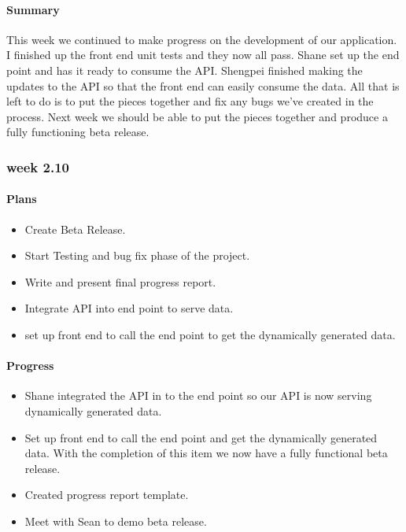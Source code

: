 \documentclass[onecolumn, draftclsnofoot,10pt, compsoc]{article}
\begin{document}
			\paragraph{Summary} \hfill \break 
			This week we continued to make progress on the development of our application. I finished up the front end unit tests and they now all pass. Shane set up the end point and has it ready to consume the API. Shengpei finished making the updates to the API so that the front end can easily consume the data. All that is left to do is to put the pieces together and fix any bugs we've created in the process. Next week we should be able to put the pieces together and produce a fully functioning beta release.\\

		\subsubsection{week 2.10}
			\paragraph{Plans} \hfill \break
				\begin{itemize}
					\item Create Beta Release.
					\item Start Testing and bug fix phase of the project.
					\item Write and present final progress report.
					\item Integrate API into end point to serve data.
					\item set up front end to call the end point to get the dynamically generated data.
				\end{itemize}
			\paragraph{Progress} \hfill \break
				\begin{itemize}
					\item Shane integrated the API in to the end point so our API is now serving dynamically generated data.
					\item Set up front end to call the end point and get the dynamically generated data. With the completion of this item we now have a fully functional beta release.
					\item Created progress report template.
					\item Meet with Sean to demo beta release.
				\end{itemize}
\end{document}
